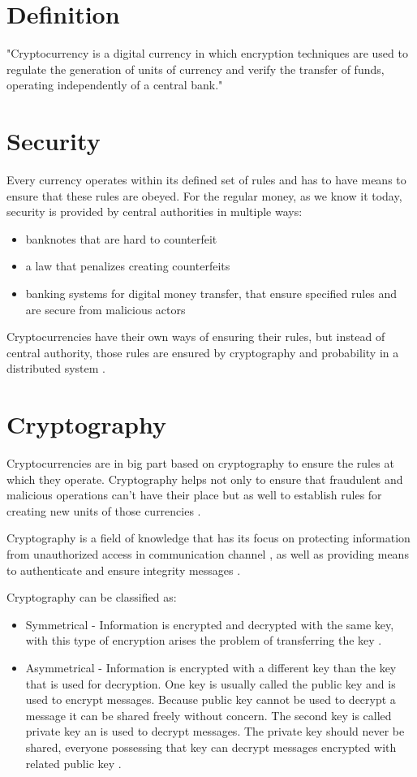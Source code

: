 \documentclass[12pt, en, eng, twoside, final]{mgr}
\begin{document}
\section{Definition}
"Cryptocurrency is a digital currency in which encryption techniques are used to regulate the generation of units of currency and verify the transfer of funds, operating independently of a central bank." \cite{crypto-def}

\section{Security}
Every currency operates within its defined set of rules and has to have means to ensure that these rules are obeyed. For the regular money, as we know it today, security is provided by central authorities in multiple ways:
\begin{itemize}
\item
banknotes that are hard to counterfeit
\item
a law that penalizes creating counterfeits
\item
banking systems for digital money transfer, that ensure specified rules and are secure from malicious actors
\end{itemize}

Cryptocurrencies have their own ways of ensuring their rules, but instead of central authority, those rules are ensured by cryptography and probability in a distributed system \cite{bartek}.

\section{Cryptography}
Cryptocurrencies are in big part based on cryptography to ensure the rules at which they operate. Cryptography helps not only to ensure that fraudulent and malicious operations can't have their place but as well to establish rules for creating new units of those currencies \cite{cryptocurrencies}. 

Cryptography is a field of knowledge that has its focus on protecting information from unauthorized access in communication channel \cite{cryptography}, as well as providing means to authenticate and ensure integrity messages \cite{cryptography-2}. 

Cryptography can be classified as:

\begin{itemize}
\item
Symmetrical - Information is encrypted and decrypted with the same key, with this type of encryption arises the problem of transferring the key \cite{bartek}.
\item
Asymmetrical - Information is encrypted with a different key than the key that is used for decryption. One key is usually called the public key and is used to encrypt messages. Because public key cannot be used to decrypt a message it can be shared freely without concern. The second key is called private key an is used to decrypt messages. The private key should never be shared, everyone possessing that key can decrypt messages encrypted with related public key \cite{bartek}.
\end{itemize} 
\end{document}
